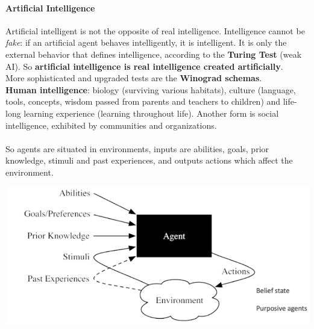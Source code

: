 \documentclass[10pt]{report}
\begin{document}
\paragraph{Artificial Intelligence} Artificial intelligent is not the opposite of real intelligence. Intelligence cannot be \textit{fake}: if an artificial agent behaves intelligently, it is intelligent. It is only the external behavior that defines intelligence, according to the \textbf{Turing Test} (weak AI). So \textbf{artificial intelligence is real intelligence created artificially}.\\
More sophisticated and upgraded tests are the \textbf{Winograd schemas}.\\
\textbf{Human intelligence}: biology (surviving various habitats), culture (language, tools, concepts, wisdom passed from parents and teachers to children) and life-long learning experience (learning throughout life). Another form is social intelligence, exhibited by communities and organizations.\\\\
So agents are situated in environments, inputs are abilities, goals, prior knowledge, stimuli and past experiences, and outputs actions which affect the environment.
\begin{center}
	\includegraphics[scale=0.5]{1.png}
\end{center}
\end{document}
